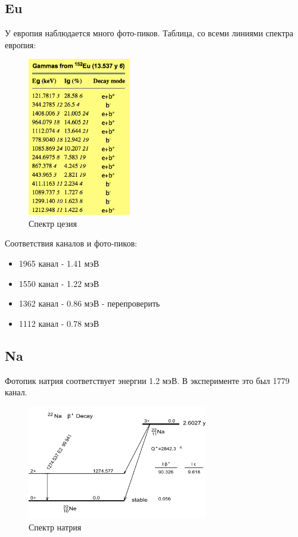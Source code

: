 \documentclass[a4paper,12pt]{article} %
\begin{document}
		\subsection*{Eu}
			У европия наблюдается много фото-пиков.
			Таблица, со всеми линиями спектра европия:
			\begin{figure}[h!]
				\includegraphics[width=0.4\textwidth]{img/152Eu.jpg}
				\centering
				\caption{Спектр цезия}
			\end{figure}\par
			Соответствия каналов и фото-пиков:
			\begin{itemize}
				\item 1965 канал - 1.41 мэВ
				\item 1550 канал - 1.22 мэВ
				\item 1362 канал - 0.86 мэВ - перепроверить
				\item 1112 канал - 0.78 мэВ
			\end{itemize}
		
		\subsection*{Na}
			Фотопик натрия соответствует энергии 1.2 мэВ.
			В эксперименте это был 1779 канал.
			\begin{figure}[h!]
				\includegraphics[width=0.7\textwidth]{img/Na-22-decay.png}
				\centering
				\caption{Спектр натрия}
			\end{figure}\par
\end{document}
